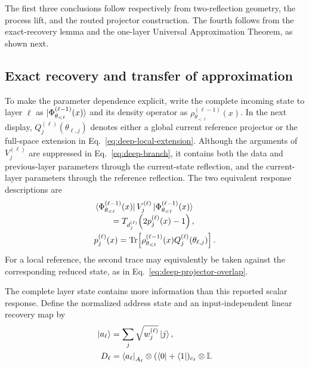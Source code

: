 \documentclass[pdflatex,sn-mathphys,NameDate,iicol]{sn-jnl}
\newcommand{\Tr}{\operatorname{Tr}}
\newcommand{\id}{\mathbb{I}}
\begin{document}
The first three conclusions follow respectively from two-reflection geometry,
the process lift, and the routed projector construction. The fourth follows
from the exact-recovery lemma and the one-layer Universal Approximation
Theorem, as shown next.

\subsection{Exact recovery and transfer of approximation}
\label{sec:deep-transfer}

To make the parameter dependence explicit, write the complete incoming state
to layer $\ell$ as
$\ket{\Phi_{\theta_{<\ell}}^{(\ell-1)}(x)}$ and its density operator as
$\rho_{\theta_{<\ell}}^{(\ell-1)}(x)$. In the next display,
$Q_j^{(\ell)}(\theta_{\ell,j})$ denotes either a global current reference
projector or the full-space extension in
Eq.~\eqref{eq:deep-local-extension}. Although the arguments of
$V_j^{(\ell)}$ are suppressed in Eq.~\eqref{eq:deep-branch}, it contains both
the data and previous-layer parameters through the current-state reflection,
and the current-layer parameters through the reference reflection. The two
equivalent response descriptions are
\begin{align}
&\bra{\Phi_{\theta_{<\ell}}^{(\ell-1)}(x)}
 V_j^{(\ell)}
 \ket{\Phi_{\theta_{<\ell}}^{(\ell-1)}(x)}\nonumber\\[-1mm]
&\qquad
 =T_{d_j^{(\ell)}}\!\left(2p_j^{(\ell)}(x)-1\right),
 \label{eq:deep-expectation-chebyshev}\\
&p_j^{(\ell)}(x)
 =\Tr\!\left[
 \rho_{\theta_{<\ell}}^{(\ell-1)}(x)
 Q_j^{(\ell)}(\theta_{\ell,j})
 \right].
 \label{eq:deep-parameterized-overlap}
\end{align}
For a local reference, the second trace may equivalently be taken against the
corresponding reduced state, as in Eq.~\eqref{eq:deep-projector-overlap}.

The complete layer state contains more information than this reported scalar
response. Define the normalized address state and an input-independent linear
recovery map by
\begin{equation}
 \begin{aligned}
 \ket{a_\ell}
 &=\sum_j\sqrt{w_j^{(\ell)}}\ket j,\\
 D_\ell
 &=\bra{a_\ell}_{A_\ell}\otimes
  (\bra0+\bra1)_{c_\ell}\otimes\id.
 \end{aligned}
 \label{eq:deep-recovery-map}
\end{equation}
\end{document}
